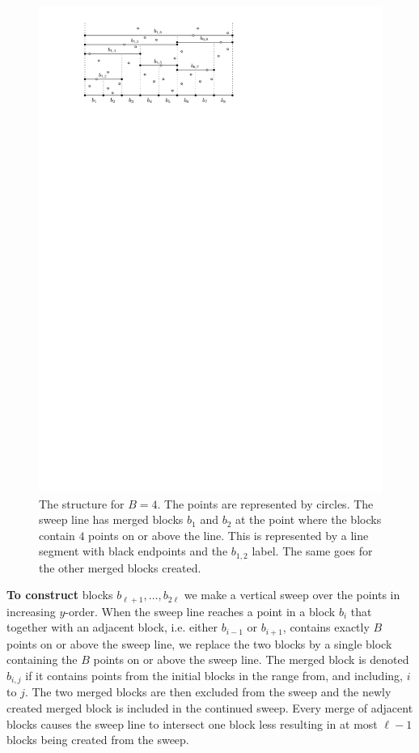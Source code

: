 \documentclass[twoside,11pt,openright]{report}
\begin{document}
\begin{figure}[h]
	\centering
	\includegraphics[scale=1]{../figures/sweep-line}
	\caption{The structure for $B=4$. The points are represented by circles. The sweep line has merged blocks $b_1$ and $b_2$ at the point where the blocks contain $4$ points on or above the line. This is represented by a line segment with black endpoints and the $b_{1,2}$ label. The same goes for the other merged blocks created.}
	\label{fig:sweep-line}
\end{figure}

\textbf{To construct} blocks $b_{\ell+1},\dots,b_{2\ell}$ we make a vertical sweep over the points in increasing $y$-order. When the sweep line reaches a point in a block $b_i$ that together with an adjacent block, i.e. either $b_{i-1}$ or $b_{i+1}$, contains exactly $B$ points on or above the sweep line, we replace the two blocks by a single block containing the $B$ points on or above the sweep line.  The merged block is denoted $b_{i,j}$ if it contains points from the initial blocks in the range from, and including, $i$ to $j$. The two merged blocks are then excluded from the sweep and the newly created merged block is included in the continued sweep. Every merge of adjacent blocks causes the sweep line to intersect one block less resulting in at most $\ell-1$ blocks being created from the sweep.
\end{document}
